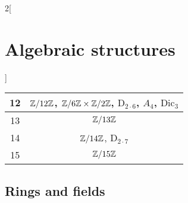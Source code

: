 \documentclass[../../../main.tex]{subfiles}
\begin{document}
\begin{multicols}{2}[\section{Algebraic structures}]
\begin{center}
\begin{tabular}{|c|c|}
      \hline
      12    & $\quot{\ZZ}{12\ZZ}$, $\quot{\ZZ}{6\ZZ}\times\quot{\ZZ}{2\ZZ}$, $\text{D}_{2\cdot 6}$, $A_4$, $\text{Dic}_3$                          \\
      \hline
      13    & $\quot{\ZZ}{13\ZZ}$                                                                                                                  \\
      \hline
      14    & $\quot{\ZZ}{14\ZZ}$, $\text{D}_{2\cdot 7}$                                                                                           \\
      \hline
      15    & $\quot{\ZZ}{15\ZZ}$                                                                                                                  \\
      \hline
    \end{tabular}
  \end{center}
  \subsection{Rings and fields}\label{AS-R}

\end{multicols}
\end{document}
